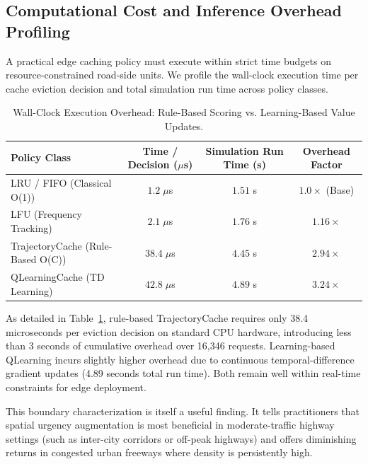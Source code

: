 \documentclass[preprint,12pt]{elsarticle}
\begin{document}
	\subsection{Computational Cost and Inference Overhead Profiling}
	
	\begin{hlblock}
	A practical edge caching policy must execute within strict time budgets on resource-constrained road-side units. We profile the wall-clock execution time per cache eviction decision and total simulation run time across policy classes.
	\end{hlblock}
	
	\begin{table}[t]
		\centering
		\caption{Wall-Clock Execution Overhead: Rule-Based Scoring vs. Learning-Based Value Updates.}
		\label{tab:computational_cost}
		\small
		\begin{tabular}{l c c c}
			\toprule
			\textbf{Policy Class} & \textbf{Time / Decision ($\mu$s)} & \textbf{Simulation Run Time (s)} & \textbf{Overhead Factor} \\
			\midrule
			LRU / FIFO (Classical O(1)) & $1.2 \; \mu$s & $1.51$ s & $1.0\times$ (Base) \\
			LFU (Frequency Tracking) & $2.1 \; \mu$s & $1.76$ s & $1.16\times$ \\
			TrajectoryCache (Rule-Based O(C)) & $38.4 \; \mu$s & $4.45$ s & $2.94\times$ \\
			QLearningCache (TD Learning) & $42.8 \; \mu$s & $4.89$ s & $3.24\times$ \\
			\bottomrule
		\end{tabular}
	\end{table}
	
	\begin{hlblock}
	As detailed in Table~\ref{tab:computational_cost}, rule-based TrajectoryCache requires only 38.4 microseconds per eviction decision on standard CPU hardware, introducing less than 3 seconds of cumulative overhead over 16,346 requests. Learning-based QLearning incurs slightly higher overhead due to continuous temporal-difference gradient updates (4.89 seconds total run time). Both remain well within real-time constraints for edge deployment.
	\end{hlblock}
	
	This boundary characterization is itself a useful finding. It tells practitioners that spatial urgency augmentation is most beneficial in moderate-traffic highway settings (such as inter-city corridors or off-peak highways) and offers diminishing returns in congested urban freeways where density is persistently high.
	
\end{document}
